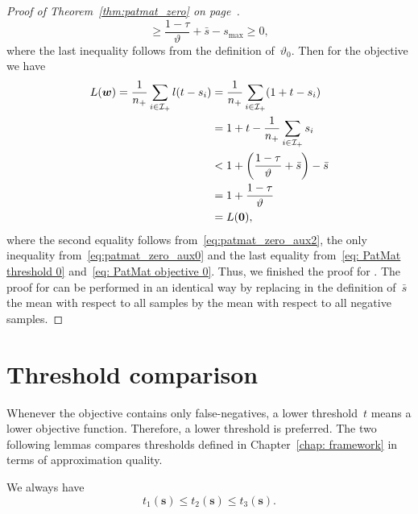 \begin{proof}[Proof of Theorem~\ref{thm:patmat_zero} on page~\pageref{thm:patmat_zero}]
\begin{equation}
    \ge \frac{1-\tau}{\vartheta} + \bar{s} - s_{\max}
    \ge 0,
  \end{equation}
  where the last inequality follows from the definition of~$\vartheta_0$. Then for the objective we have
  \begin{equation*}
    \begin{aligned}
      L(\bm{w}) = \frac{1}{\npos}\sum_{i \in \Ipos}l(t-s_i)
      & = \frac{1}{\npos}\sum_{i \in \Ipos}\Brac{1+t-s_i} \\
      & = 1 + t - \frac{1}{\npos}\sum_{i \in \Ipos} s_i \\
      & < 1 + \Brac{\frac{1 - \tau}{\vartheta} + \bar{s}} - \bar{s} \\
      & = 1 + \frac{1-\tau}{\vartheta} \\
      & = L(\bm{0}),\\
    \end{aligned}
  \end{equation*}
  where the second equality follows from~\eqref{eq:patmat_zero_aux2}, the only inequality from~\eqref{eq:patmat_zero_aux0} and the last equality from~\eqref{eq: PatMat threshold 0} and~\eqref{eq: PatMat objective 0}. Thus, we finished the proof for \PatMat. The proof for \PatMatNP can be performed in an identical way by replacing in the definition of~$\bar{s}$ the mean with respect to all samples by the mean with respect to all negative samples.
\end{proof}

\section{Threshold comparison}\label{app:relations}

Whenever the objective contains only false-negatives, a lower threshold~$t$ means a lower objective function. Therefore, a lower threshold is preferred. The two following lemmas compares thresholds defined in Chapter~\ref{chap: framework} in terms of approximation quality.
\begin{lemma}\label{prop: threholds}
  We always have
  \begin{equation*}
    t_1(\bm{s}) \le t_2(\bm{s}) \le t_3(\bm{s}).
  \end{equation*}
\end{lemma}

\pagebreak

